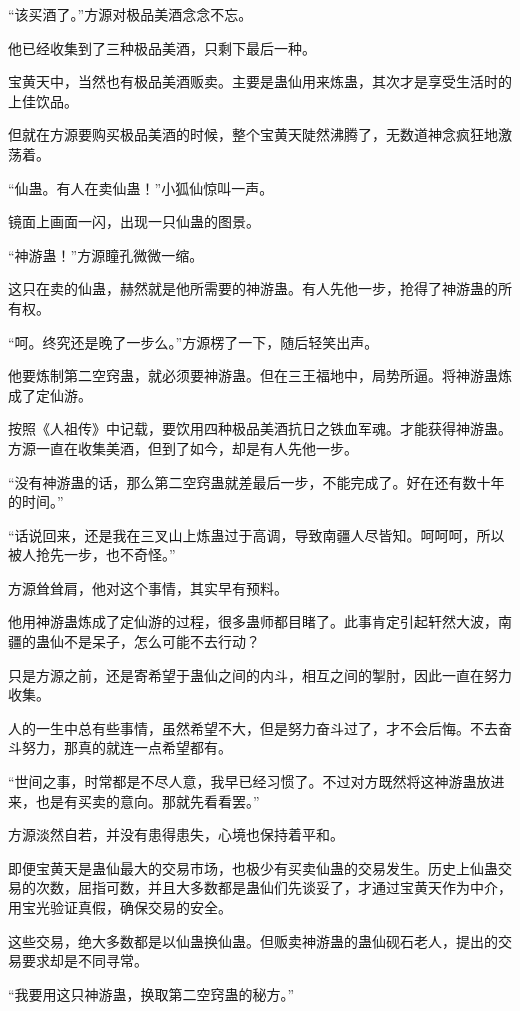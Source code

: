 \begin{this_body}
“该买酒了。”方源对极品美酒念念不忘。

他已经收集到了三种极品美酒，只剩下最后一种。

宝黄天中，当然也有极品美酒贩卖。主要是蛊仙用来炼蛊，其次才是享受生活时的上佳饮品。

但就在方源要购买极品美酒的时候，整个宝黄天陡然沸腾了，无数道神念疯狂地激荡着。

“仙蛊。有人在卖仙蛊！”小狐仙惊叫一声。

镜面上画面一闪，出现一只仙蛊的图景。

“神游蛊！”方源瞳孔微微一缩。

这只在卖的仙蛊，赫然就是他所需要的神游蛊。有人先他一步，抢得了神游蛊的所有权。

“呵。终究还是晚了一步么。”方源楞了一下，随后轻笑出声。

他要炼制第二空窍蛊，就必须要神游蛊。但在三王福地中，局势所逼。将神游蛊炼成了定仙游。

按照《人祖传》中记载，要饮用四种极品美酒抗日之铁血军魂。才能获得神游蛊。方源一直在收集美酒，但到了如今，却是有人先他一步。

“没有神游蛊的话，那么第二空窍蛊就差最后一步，不能完成了。好在还有数十年的时间。”

“话说回来，还是我在三叉山上炼蛊过于高调，导致南疆人尽皆知。呵呵呵，所以被人抢先一步，也不奇怪。”

方源耸耸肩，他对这个事情，其实早有预料。

他用神游蛊炼成了定仙游的过程，很多蛊师都目睹了。此事肯定引起轩然大波，南疆的蛊仙不是呆子，怎么可能不去行动？

只是方源之前，还是寄希望于蛊仙之间的内斗，相互之间的掣肘，因此一直在努力收集。

人的一生中总有些事情，虽然希望不大，但是努力奋斗过了，才不会后悔。不去奋斗努力，那真的就连一点希望都有。

“世间之事，时常都是不尽人意，我早已经习惯了。不过对方既然将这神游蛊放进来，也是有买卖的意向。那就先看看罢。”

方源淡然自若，并没有患得患失，心境也保持着平和。

即便宝黄天是蛊仙最大的交易市场，也极少有买卖仙蛊的交易发生。历史上仙蛊交易的次数，屈指可数，并且大多数都是蛊仙们先谈妥了，才通过宝黄天作为中介，用宝光验证真假，确保交易的安全。

这些交易，绝大多数都是以仙蛊换仙蛊。但贩卖神游蛊的蛊仙砚石老人，提出的交易要求却是不同寻常。

“我要用这只神游蛊，换取第二空窍蛊的秘方。”


\end{this_body}
